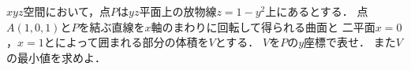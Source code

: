 \documentclass[../../main.tex]{subfiles}
\begin{document}
$xyz$空間において，点$P$は$yz$平面上の放物線$z=1-y^2$上にあるとする．
点$A(1,0,1)$と$P$を結ぶ直線を$x$軸のまわりに回転して得られる曲面と
二平面$x=0$，$x=1$とによって囲まれる部分の体積を$V$とする．
$V$を$P$の$y$座標で表せ．
また$V$の最小値を求めよ．
\end{document}
